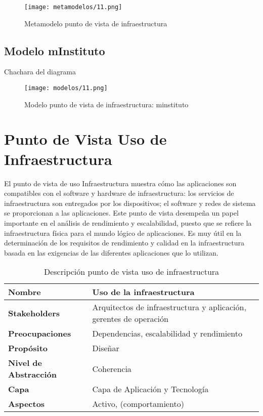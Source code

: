   \begin{figure}[!h]
	\centering
	\texttt{[image: metamodelos/11.png]}
	\captionsetup{width=.95\textwidth}
	\caption{Metamodelo punto de vista de infraestructura}
	\label{metamodelo11}
  \end{figure}

  \subsection{Modelo mInstituto}Chachara del diagrama
  \begin{figure}[!h]
	\centering
	\texttt{[image: modelos/11.png]}
 	\captionsetup{width=.95\textwidth}
	\caption{Modelo punto de vista de infraestructura: minstituto}
	\label{modelo11}
  \end{figure}
  
  \section{Punto de Vista Uso de Infraestructura}
  El punto de vista de uso Infraestructura muestra cómo las aplicaciones son compatibles con el software y hardware de infraestructura: los servicios de infraestructura son entregados por los dispositivos; el software y redes de sistema se proporcionan a las aplicaciones. Este punto de vista desempeña un papel importante en el análisis de rendimiento y escalabilidad, puesto que se refiere la infraestructura física para el mundo lógico de aplicaciones. Es muy útil en la determinación de los requisitos de rendimiento y calidad en la infraestructura basada en las exigencias de las diferentes aplicaciones que lo utilizan.
  
  \begin{table}[!h]
  	\centering
  	\begin{tabular}{lp{8cm}}
  		\toprule
  		\textbf{Nombre} & \textbf{Uso de la infraestructura} \\
  		\midrule
  		\textbf{Stakeholders} & Arquitectos de infraestructura y aplicación, gerentes de operación \\
  		\textbf{Preocupaciones} & Dependencias, escalabilidad y rendimiento \\
  		\textbf{Propósito} & Diseñar \\
  		\textbf{Nivel de Abstracción} & Coherencia \\
  		\textbf{Capa} & Capa de Aplicación y Tecnología \\
  		\textbf{Aspectos} & Activo, (comportamiento) \\
  		\bottomrule
  	\end{tabular}
  	\captionsetup{width=.95\textwidth}
  	\caption{Descripción punto de vista uso de infraestructura}
  	\label{tabla15}
  \end{table}
  
